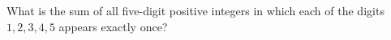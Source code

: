 What is the sum of all five-digit positive integers in which each of the digits $1,2,3,4,5$ appears exactly once?
